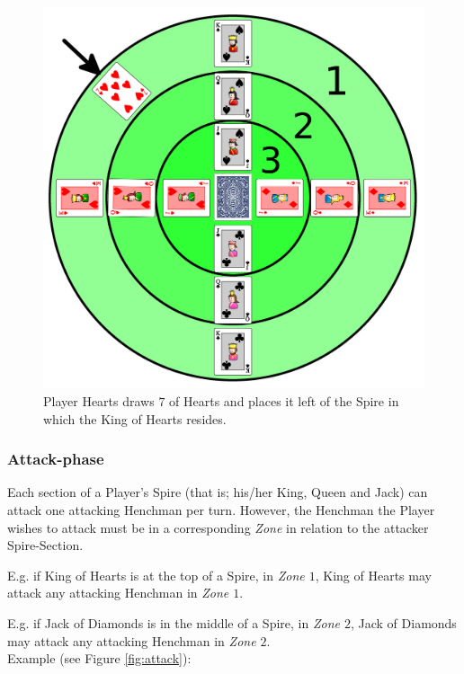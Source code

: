 \documentclass[11pt,twocolumn]{article}
\begin{document}
\begin{figure}[h!]
\centering
\includegraphics[width=\linewidth]{img/draw.png}
\caption{Player Hearts draws $7$ of Hearts and places it left of the Spire in which the King of Hearts resides.}
\label{fig:draw}
\end{figure}

\subsubsection{Attack-phase}
\label{sec:playingshufflespires_attackphase}
Each section of a Player's Spire (that is; his/her King, Queen and Jack) can attack one attacking Henchman per turn.
However, the Henchman the Player wishes to attack must be in a corresponding \textit{Zone} in relation to the attacker Spire-Section.

E.g. if King of Hearts is at the top of a Spire, in \textit{Zone $1$}, King of Hearts may attack any attacking Henchman in \textit{Zone $1$}.

E.g. if Jack of Diamonds is in the middle of a Spire, in \textit{Zone $2$}, Jack of Diamonds may attack any attacking Henchman in \textit{Zone $2$}.\\

\noindent
Example (see Figure \ref{fig:attack}):
\end{document}
